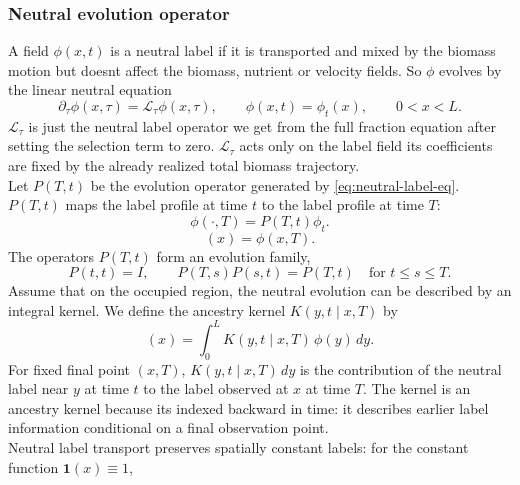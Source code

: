 \documentclass[11pt,a4paper]{report}
\begin{document}
	\subsubsection{Neutral evolution operator}
	
	A field \(\phi(x,t)\) is a neutral label if it is transported and mixed by the
	biomass motion but doesnt affect the biomass, nutrient or velocity fields.
	So \(\phi\) evolves by the linear neutral equation
	\begin{equation}
		\partial_\tau \phi(x,\tau)
		=
		\mathcal L_\tau \phi(x,\tau),
		\qquad
		\phi(x,t)=\phi_t(x),
		\qquad 0<x<L .
		\label{eq:neutral-label-eq}
	\end{equation}
	\(\mathcal L_\tau\) is just the neutral label operator we get from the full
	fraction equation after setting the selection term to zero. \(\mathcal L_\tau\) acts only on the label field its coefficients are fixed by the already realized total biomass trajectory.\\
	Let \(P(T,t)\) be the evolution operator generated by
	\eqref{eq:neutral-label-eq}. \(P(T,t)\) maps the label profile at time
	\(t\) to the label profile at time \(T\):
	\begin{equation}
		\phi(\cdot,T)=P(T,t)\phi_t .
		\label{eq:def-P}
	\end{equation}
	\begin{equation}
		[P(T,t)\phi_t](x)=\phi(x,T).
		\label{eq:P-action}
	\end{equation}
	The operators \(P(T,t)\) form an evolution family,
	\begin{equation}
		P(t,t)=I,
		\qquad
		P(T,s)P(s,t)=P(T,t)
		\quad\text{for }t\le s\le T .
		\label{eq:evolution-family}
	\end{equation}
	Assume that on the occupied region, the neutral evolution
	can be described by an integral kernel. We define the ancestry kernel
	\(K(y,t\mid x,T)\) by
	\begin{equation}
		[P(T,t)\phi](x)
		=
		\int_0^L K(y,t\mid x,T)\,\phi(y)\,dy .
		\label{eq:kernel-def}
	\end{equation}
	For fixed final point \((x,T)\),
	\(K(y,t\mid x,T)\,dy\) is the contribution of the neutral label
	near \(y\) at time \(t\) to the label observed at \(x\) at time \(T\).
	The kernel is an ancestry kernel because its indexed backward in time: it
	describes earlier label information conditional on a final observation point.\\
	Neutral label transport preserves spatially constant labels: for the
	constant function \(\mathbf 1(x)\equiv 1\),
\end{document}
